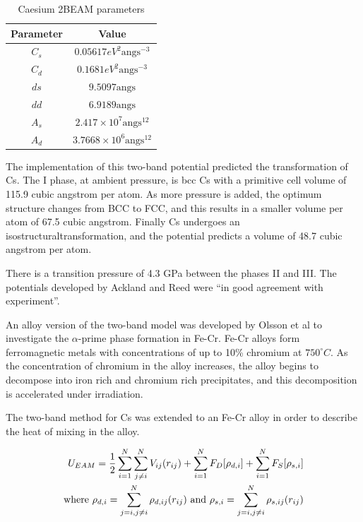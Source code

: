 \begin{table}[h]
\begin{center}
\renewcommand{\arraystretch}{1.2}
\begin{tabular}{c c}
\hline\hline
Parameter & Value \\
\hline\hline
$C_s$ & $0.05617 eV^2 \text{angs}^{-3}$ \\
$C_d$ & $0.1681 eV^2 \text{angs}^{-3}$ \\
$ds$  & $9.5097 \text{angs}$ \\
$dd$  & $6.9189 \text{angs}$ \\
$A_s$ & $2.417 \times 10^7 \text{angs}^{12}$ \\
$A_d$ & $3.7668 \times 10^6 \text{angs}^{12}$ \\
\hline\hline
\end{tabular}
\caption{Caesium 2BEAM parameters}
\label{table:caesiumeamparameters}
\end{center}
\end{table}

The implementation of this two-band potential predicted the transformation of \Gls{Cs}.  The I phase, at ambient pressure, is \acrshort{bcc} \Gls{Cs} with a primitive cell volume of 115.9 cubic angstrom per atom.  As more pressure is added, the optimum structure changes from BCC to FCC, and this results in a smaller volume per atom of 67.5 cubic angstrom.  Finally \Gls{Cs} undergoes an \gls{isostructuraltransformation}, and the potential predicts a volume of 48.7 cubic angstrom per atom.

There is a transition pressure of 4.3 GPa between the phases II and III.  The potentials developed by Ackland and Reed were \enquote{in good agreement with experiment}\cite{twobandackland}.

An alloy version of the two-band model was developed by Olsson et al to investigate the $\alpha$-prime phase formation in Fe-Cr\cite{olssonfecr}. Fe-Cr alloys form ferromagnetic metals with concentrations of up to 10\% chromium at $750^{\circ}C$.  As the concentration of chromium in the alloy increases, the alloy begins to decompose into iron rich and chromium rich precipitates, and this decomposition is accelerated under irradiation.

The two-band method for \Gls{Cs} was extended to an Fe-Cr alloy in order to describe the heat of mixing in the alloy.

\begin{equation}
\begin{split}
U_{EAM} = \frac{1}{2} \sum \limits_{i=1}^{N} \sum \limits_{j\ne i}^{N} V_{ij}(r_{ij}) + \sum \limits_{i=1}^{N} F_{D}[\rho _{d,i}] + \sum \limits_{i=1}^{N} F_{S}[\rho _{s,i}] \\
\textnormal{where   } \rho_{d,i} = \sum \limits_{j=i,j \ne i}^{N} \rho_{d,ij}(r_{ij})
\textnormal{  and  } \rho_{s,i} = \sum \limits_{j=i,j \ne i}^{N} \rho_{s,ij}(r_{ij})
\end{split}
\end{equation}


